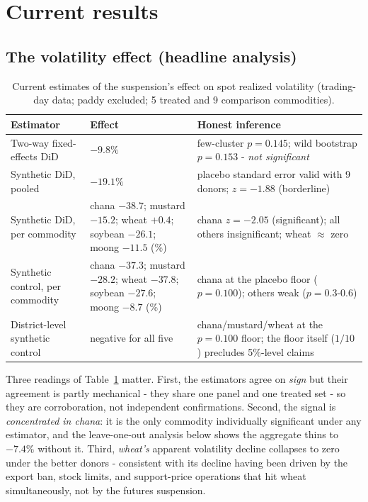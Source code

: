 \documentclass[11pt]{article}
\begin{document}
\section{Current results}
\label{sec:results}

\subsection{The volatility effect (headline analysis)}

\begin{table}[htbp]
\centering\small
\caption{Current estimates of the suspension's effect on spot realized volatility
(trading-day data; paddy excluded; 5 treated and 9 comparison commodities).}
\label{tab:results}
\begin{tabular}{p{4.3cm} p{2.9cm} p{6.4cm}}
\toprule
Estimator & Effect & Honest inference \\
\midrule
Two-way fixed-effects DiD & $-9.8\%$ & few-cluster $p=0.145$; wild bootstrap $p=0.153$ - \emph{not significant} \\
Synthetic DiD, pooled & $-19.1\%$ & placebo standard error valid with 9 donors; $z=-1.88$ (borderline) \\
Synthetic DiD, per commodity & chana $-38.7$; mustard $-15.2$; wheat $+0.4$; soybean $-26.1$; moong $-11.5$ (\%) & chana $z=-2.05$ (significant); all others insignificant; wheat $\approx$ zero \\
Synthetic control, per commodity & chana $-37.3$; mustard $-28.2$; wheat $-37.8$; soybean $-27.6$; moong $-8.7$ (\%) & chana at the placebo floor ($p=0.100$); others weak ($p=0.3$-$0.6$) \\
District-level synthetic control & negative for all five & chana/mustard/wheat at the $p=0.100$ floor; the floor itself ($1/10$) precludes 5\%-level claims \\
\bottomrule
\end{tabular}
\end{table}

Three readings of Table~\ref{tab:results} matter. First, the estimators agree on
\emph{sign} but their agreement is partly mechanical - they share one panel and one
treated set - so they are corroboration, not independent confirmations. Second, the
signal is \emph{concentrated in chana}: it is the only commodity individually significant
under any estimator, and the leave-one-out analysis below shows the aggregate thins to
$-7.4\%$ without it. Third, \emph{wheat's} apparent volatility decline collapses to zero
under the better donors - consistent with its decline having been driven by the export
ban, stock limits, and support-price operations that hit wheat simultaneously, not by the
futures suspension.
\end{document}
